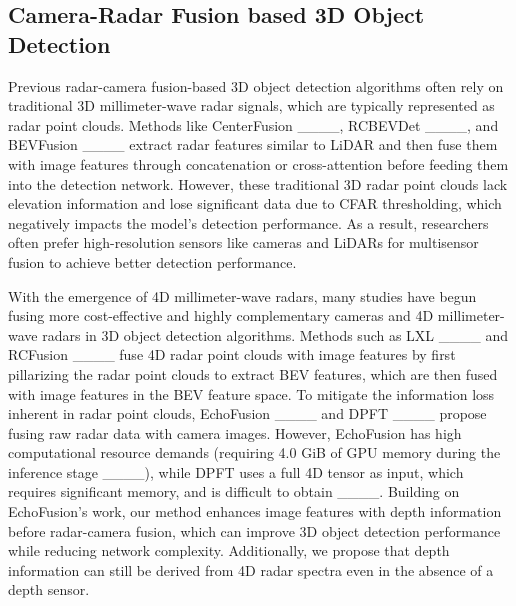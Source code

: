\subsection{Camera-Radar Fusion based 3D Object Detection}
Previous radar-camera fusion-based 3D object detection algorithms often rely on traditional 3D millimeter-wave radar signals, 
which are typically represented as radar point clouds. 
Methods like CenterFusion ____, RCBEVDet ____, and BEVFusion ____ 
extract radar features similar to LiDAR and then fuse them with image features through concatenation or cross-attention before feeding them into the detection network. 
However, these traditional 3D radar point clouds lack elevation information and lose significant data due to CFAR thresholding, 
which negatively impacts the model’s detection performance. 
As a result, researchers often prefer high-resolution sensors like cameras and LiDARs for multisensor fusion to achieve better detection performance.

With the emergence of 4D millimeter-wave radars, 
many studies have begun fusing more cost-effective and highly complementary cameras and 4D millimeter-wave radars in 3D object detection algorithms.
Methods such as LXL ____ and RCFusion ____ 
fuse 4D radar point clouds with image features by first pillarizing the radar point clouds to extract BEV features, 
which are then fused with image features in the BEV feature space.
To mitigate the information loss inherent in radar point clouds, 
EchoFusion ____ and DPFT ____ propose fusing raw radar data with camera images. 
However, EchoFusion has high computational resource demands (requiring 4.0 GiB of GPU memory during the inference stage ____), 
while DPFT uses a full 4D tensor as input, which requires significant memory, and is difficult to obtain ____. 
Building on EchoFusion's work, 
our method enhances image features with depth information before radar-camera fusion, 
which can improve 3D object detection performance while reducing network complexity. 
Additionally, we propose that depth information can still be derived from 4D radar spectra even in the absence of a depth sensor.

